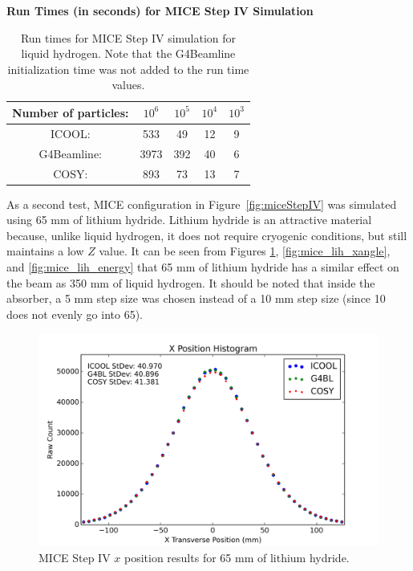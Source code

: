 \begin{table}
\caption*{\textbf{Run Times (in seconds) for MICE Step IV Simulation}}
\begin{center}
\begin{tabularx}{0.6\textwidth}{ccccc}
\hline \hline
Number of particles: & $10^6$ & $10^5$ & $10^4$ & $10^3$\\
\hline
ICOOL: & 533 & 49 & 12 & 9\vspace{-12pt}\\
G4Beamline: & 3973 & 392 & 40 & 6\vspace{-12pt}\\
COSY: & 893 & 73 & 13 & 7\\
\hline
\end{tabularx}
\end{center}
\caption[Run times for MICE Step IV simulation.]{Run times for MICE Step IV simulation for liquid hydrogen. Note that the G4Beamline initialization time was not added to the run time values.}
\label{tbl:mice_times}
\end{table}

As a second test, MICE configuration in Figure~\ref{fig:miceStepIV} was simulated using 65 mm of lithium hydride. Lithium hydride is an attractive material because, unlike liquid hydrogen, it does not require cryogenic conditions, but still maintains a low $Z$ value. It can be seen from Figures \ref{fig:mice_lih_x}, \ref{fig:mice_lih_xangle}, and \ref{fig:mice_lih_energy} that 65 mm of lithium hydride has a similar effect on the beam as 350 mm of liquid hydrogen. It should be noted that inside the absorber, a 5 mm step size was chosen instead of a 10 mm step size (since 10 does not evenly go into 65).

\begin{figure}[H]
  \centering
    \includegraphics[width=\textwidth]{MICE data/LiH/x} 
  \caption{MICE Step IV $x$ position results for 65 mm of lithium hydride.}
  \label{fig:mice_lih_x}
\end{figure}

